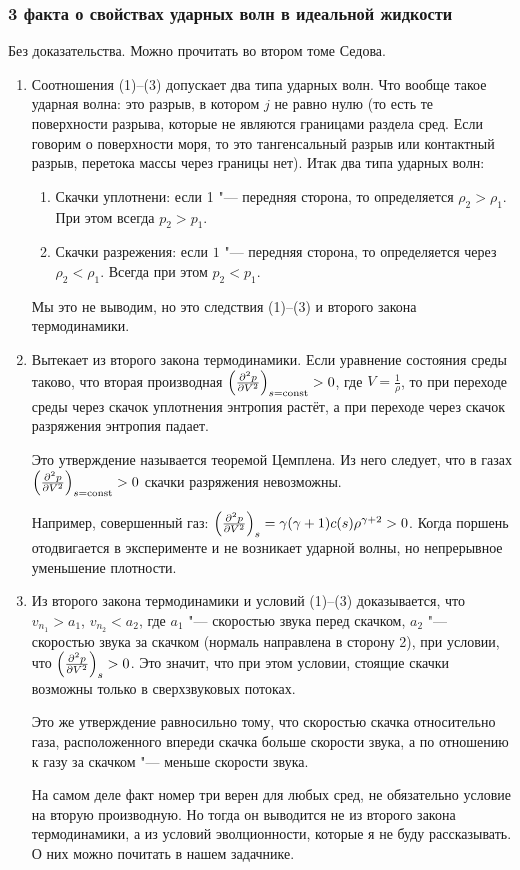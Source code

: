\subsubsection{3 факта о свойствах ударных волн в идеальной жидкости}
Без доказательства. Можно прочитать во втором томе Седова.
\begin{enumerate}
	\item Соотношения (1)--(3) допускает два типа ударных волн. Что вообще такое ударная волна: это разрыв, в котором $j$ не равно нулю (то есть те поверхности разрыва, которые не являются границами раздела сред. Если говорим о поверхности моря, то это тангенсальный разрыв или контактный разрыв, перетока массы через границы нет). Итак два типа ударных волн:
		\begin{enumerate}
			\item Скачки уплотнени: если 1 "--- передняя сторона, то определяется $\rho_2>\rho_1$. При этом всегда $p_2>p_1$.
			\item Скачки разрежения: если $1$ "--- передняя сторона, то определяется через $\rho_2<\rho_1$. Всегда при этом $p_2<p_1$.
		\end{enumerate}
	Мы это не выводим, но это следствия (1)--(3) и второго закона термодинамики.
\item Вытекает из второго закона термодинамики. Если уравнение состояния среды таково, что вторая производная $\left(\frac{\partial ^2p}{\partial V^2}\right)_{s=\operatorname{const}}>0$, где $V = \frac1\rho$, то при переходе среды через скачок уплотнения энтропия растёт, а при переходе через скачок разряжения энтропия падает.

	Это утверждение называется теоремой Цемплена. Из него следует, что в газах $\left(\frac{\partial ^2p}{\partial V^2}\right)_{s=\operatorname{const}}>0$ скачки разряжения невозможны.

	Например, совершенный газ: $\left(\frac{\partial ^2p}{\partial V^2}\right)_s = \gamma(\gamma+1)c(s)\rho^{\gamma+2}>0$. Когда поршень отодвигается в эксперименте и не возникает ударной волны, но непрерывное уменьшение плотности.
\item Из второго закона термодинамики и условий (1)--(3) доказывается, что $v_{n_1}>a_1$, $v_{n_2}<a_2$, где $a_1$ "--- скоростью звука перед скачком, $a_2$ "--- скоростью звука за скачком (нормаль направлена в сторону 2), при условии, что $\left(\frac{\partial ^2p}{\partial V^2}\right)_s>0$. Это значит, что при этом условии, стоящие скачки возможны только в сверхзвуковых потоках.

	Это же утверждение равносильно тому, что скоростью скачка относительно газа, расположенного впереди скачка больше скорости звука, а по отношению к газу за скачком "--- меньше скорости звука.

	На самом деле факт номер три верен для любых сред, не обязательно условие на вторую производную. Но тогда он выводится не из второго закона термодинамики, а из условий эволционности, которые я не буду рассказывать. О них можно почитать в нашем задачнике.
\end{enumerate}
